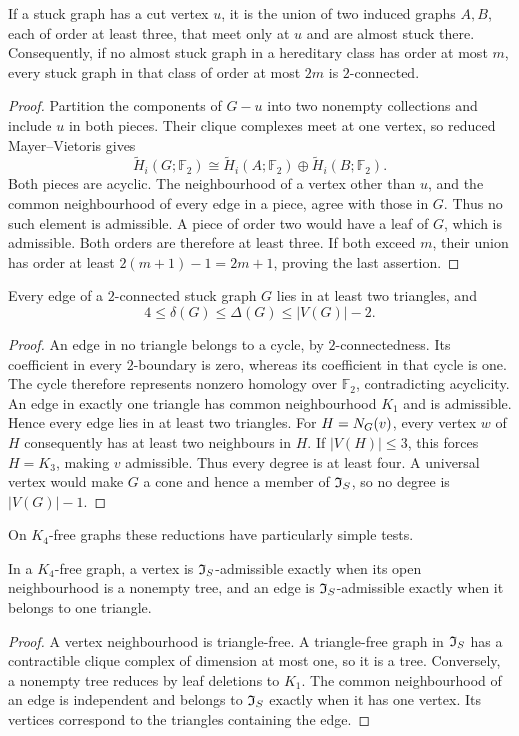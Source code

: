 \begin{lemma}\label{lem:2conn}
If a stuck graph has a cut vertex $u$, it is the union of two induced
graphs $A,B$, each of order at least three, that meet only at $u$ and
are almost stuck there. Consequently, if no almost stuck graph in a
hereditary class has order at most $m$, every stuck graph in that
class of order at most $2m$ is $2$-connected.
\end{lemma}
\begin{proof}
Partition the components of $G-u$ into two nonempty collections and
include $u$ in both pieces. Their clique complexes meet at one
vertex, so reduced Mayer--Vietoris gives
\[
 \widetilde H_i(G;\mathbb F_2)\cong
 \widetilde H_i(A;\mathbb F_2)\oplus
 \widetilde H_i(B;\mathbb F_2).
\]
Both pieces are acyclic. The neighbourhood of a vertex other than
$u$, and the common neighbourhood of every edge in a piece, agree
with those in $G$. Thus no such element is admissible. A piece of
order two would have a leaf of $G$, which is admissible. Both orders
are therefore at least three. If both exceed $m$, their union has
order at least $2(m+1)-1=2m+1$, proving the last assertion.
\end{proof}

\begin{lemma}\label{lem:degrees}
Every edge of a $2$-connected stuck graph $G$ lies in at least two
triangles, and
\[
 4\le\delta(G)\le\Delta(G)\le |V(G)|-2.
\]
\end{lemma}
\begin{proof}
An edge in no triangle belongs to a cycle, by $2$-connectedness.
Its coefficient in every $2$-boundary is zero, whereas its coefficient
in that cycle is one. The cycle therefore represents nonzero homology
over $\mathbb F_2$, contradicting acyclicity.
An edge in exactly one triangle has common neighbourhood $K_1$ and
is admissible. Hence every edge lies in at least two triangles.
For $H=N_G(v)$, every vertex $w$ of $H$ consequently has at least
two neighbours in $H$. If $|V(H)|\le3$, this forces $H=K_3$, making
$v$ admissible. Thus every degree is at least four. A universal
vertex would make $G$ a cone and hence a member of $\mathfrak I_S$, so no
degree is $|V(G)|-1$.
\end{proof}

On $K_4$-free graphs these reductions have particularly simple tests.
\begin{proposition}\label{rem:K4-local}
In a $K_4$-free graph, a vertex is $\mathfrak I_S$-admissible exactly when its
open neighbourhood is a nonempty tree, and an edge is $\mathfrak I_S$-admissible
exactly when it belongs to one triangle.
\end{proposition}
\begin{proof}
A vertex neighbourhood is triangle-free. A triangle-free graph in
$\mathfrak I_S$ has a contractible clique complex of dimension at most one,
so it is a tree. Conversely, a nonempty tree reduces by leaf deletions
to $K_1$. The common neighbourhood of an edge is independent and
belongs to $\mathfrak I_S$ exactly when it has one vertex. Its vertices
correspond to the triangles containing the edge.
\end{proof}

